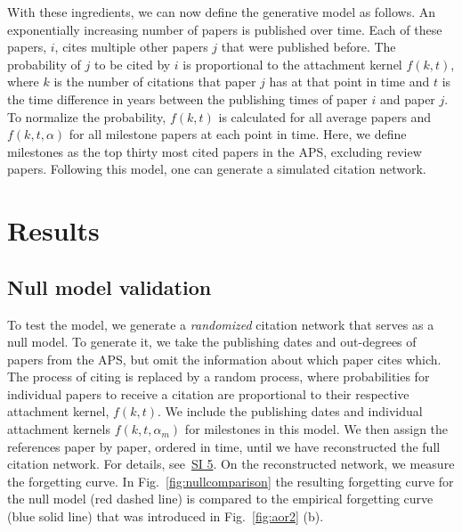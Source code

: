 \documentclass[draft,final]{vutinfth} %
\begin{document}
With these ingredients, we can now define the generative model as follows. An exponentially increasing number of papers is published over time. Each of these papers, $i$, cites multiple other papers $j$ that were published before. The probability of $j$ to be cited by $i$ is proportional to the attachment kernel $f(k, t)$, where $k$ is the number of citations that paper $j$ has at that point in time and $t$ is the time difference in years between the publishing times of paper $i$ and paper $j$. To normalize the probability, $f(k,t)$ is calculated for all average papers and  $f(k,t,\alpha)$ for all milestone papers at each point in time. Here, we define milestones as the top thirty most cited papers in the APS, excluding review papers. Following this model, one can generate a simulated citation network.

\section{Results}
\subsection{Null model validation} To test the model, we generate a {\em randomized} citation network that serves as a null model. To generate it, we take the publishing dates and out-degrees of papers from the APS, but omit the information about which paper cites which. The process of citing is replaced by a random process, where probabilities for individual papers to receive a citation are proportional to their respective attachment kernel, $f(k, t)$. We include the publishing dates and individual attachment kernels $f(k, t, \alpha_m)$ for milestones in this model. We then assign the references paper by paper, ordered in time, until we have reconstructed the full citation network. For details, see~\hyperref[SI5]{SI 5}. On the reconstructed network, we measure the forgetting curve. In Fig.~\ref{fig:nullcomparison} the resulting forgetting curve for the null model (red dashed line) is compared to the empirical forgetting curve  (blue solid line) that was introduced in Fig.~\ref{fig:aor2} (b). 
\end{document}
